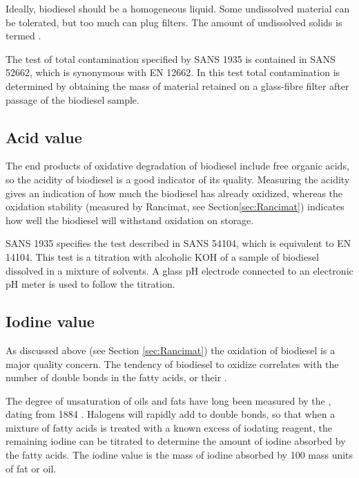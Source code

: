 Ideally, biodiesel should be a homogeneous liquid. Some undissolved material can
be tolerated, but too much can plug filters. The amount of undissolved solids is
termed .

The test of total contamination specified by SANS 1935 is contained in SANS
52662, which is synonymous with EN 12662. In this test total contamination is
determined by obtaining the mass of material retained on a glass-fibre filter
after passage of the biodiesel sample.

\subsection{Acid value}

The end products of oxidative degradation of biodiesel include free organic acids, so the
acidity of biodiesel is a good indicator of its quality. Measuring the acidity
gives an indication of how much the biodiesel has already oxidized, whereas the
oxidation stability (measured by Rancimat, see Section\ref{sec:Rancimat})
indicates how well the biodiesel will withstand oxidation on storage.

SANS 1935 specifies the test described in SANS 54104, which is equivalent to EN
14104. This test is a titration with alcoholic KOH of a sample of biodiesel
dissolved in a mixture of solvents. A glass pH electrode connected to an
electronic pH meter is used to follow the titration.

\subsection{Iodine value}

As discussed above (see Section \ref{sec:Rancimat}) the oxidation of biodiesel
is a major quality concern. The tendency of biodiesel to oxidize correlates with
the number of double bonds in the fatty acids, or their .


The degree of unsaturation of oils and fats have long been measured by the
, dating from 1884 \autocite{Knothe2007}. Halogens will
rapidly add to double bonds, so that when a mixture of fatty acids is treated
with a known excess of iodating reagent, the remaining iodine can be titrated to
determine the amount of iodine absorbed by the fatty acids. The iodine value is
the mass of iodine absorbed by 100 mass units of fat or oil.

